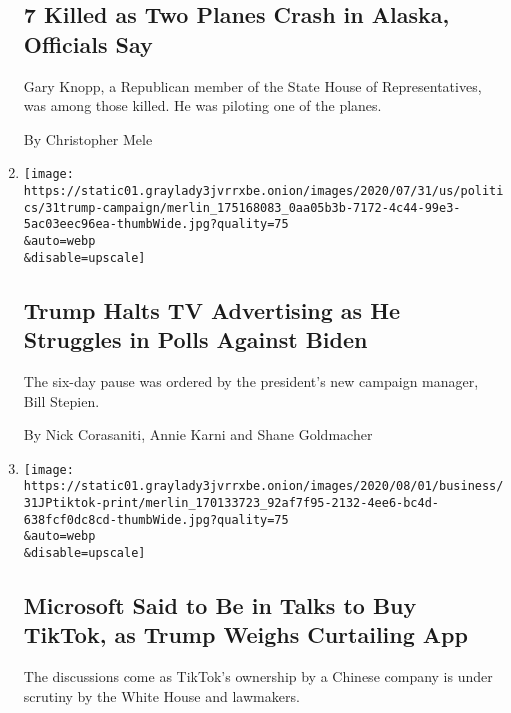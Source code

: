 \begin{enumerate}
  \hypertarget{7-killed-as-two-planes-crash-in-alaska-officials-say}{%
  \subsection{7 Killed as Two Planes Crash in Alaska, Officials
  Say}\label{7-killed-as-two-planes-crash-in-alaska-officials-say}}

  Gary Knopp, a Republican member of the State House of Representatives,
  was among those killed. He was piloting one of the planes.

  By Christopher Mele
\item
  \href{/2020/07/31/us/politics/trump-campaign-tv-advertising.html}{}

  \texttt{[image: https://static01.graylady3jvrrxbe.onion/images/2020/07/31/us/politics/31trump-campaign/merlin\_175168083\_0aa05b3b-7172-4c44-99e3-5ac03eec96ea-thumbWide.jpg?quality=75\\\&auto=webp\\\&disable=upscale]}

  \hypertarget{trump-halts-tv-advertising-as-he-struggles-in-polls-against-biden}{%
  \subsection{Trump Halts TV Advertising as He Struggles in Polls
  Against
  Biden}\label{trump-halts-tv-advertising-as-he-struggles-in-polls-against-biden}}

  The six-day pause was ordered by the president's new campaign manager,
  Bill Stepien.

  By Nick Corasaniti, Annie Karni and Shane Goldmacher
\item
  \href{/2020/07/31/technology/tiktok-microsoft.html}{}

  \texttt{[image: https://static01.graylady3jvrrxbe.onion/images/2020/08/01/business/31JPtiktok-print/merlin\_170133723\_92af7f95-2132-4ee6-bc4d-638fcf0dc8cd-thumbWide.jpg?quality=75\\\&auto=webp\\\&disable=upscale]}

  \hypertarget{microsoft-said-to-be-in-talks-to-buy-tiktok-as-trump-weighs-curtailing-app}{%
  \subsection{Microsoft Said to Be in Talks to Buy TikTok, as Trump
  Weighs Curtailing
  App}\label{microsoft-said-to-be-in-talks-to-buy-tiktok-as-trump-weighs-curtailing-app}}

  The discussions come as TikTok's ownership by a Chinese company is
  under scrutiny by the White House and lawmakers.


\end{enumerate}
